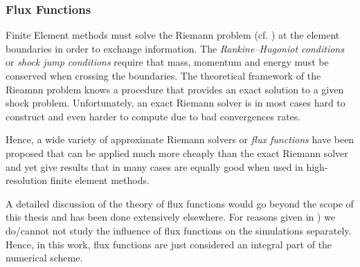 \subsubsection{Flux Functions}
\label{sec:flux-functions}
Finite Element methods must solve the Riemann problem (cf. )
at the element boundaries in order to exchange information.  The
\emph{Rankine–Hugoniot conditions} or \emph{shock jump conditions} require that
mass, momentum and energy must be conserved when crossing the boundaries. The
theoretical framework of the Rieamnn problem knows a procedure that provides an
exact solution to a given shock problem. Unfortunately, an exact Riemann solver
is in most cases hard to construct and even harder to compute due to bad
convergences rates.

Hence, a wide variety of approximate Riemann solvers or \emph{flux functions}
have been proposed that can be applied much more cheaply than the exact Riemann
solver and yet give results that in many cases are equally good when used in
high-resolution finite element methods. 

A detailed discussion of the theory of flux functions would go beyond the scope
of this thesis and has been done extensively elsewhere. For reasons given in
) we do/cannot not study the influence of flux
functions on the simulations separately. Hence, in this work, flux functions are
just considered an integral part of the numerical scheme.
